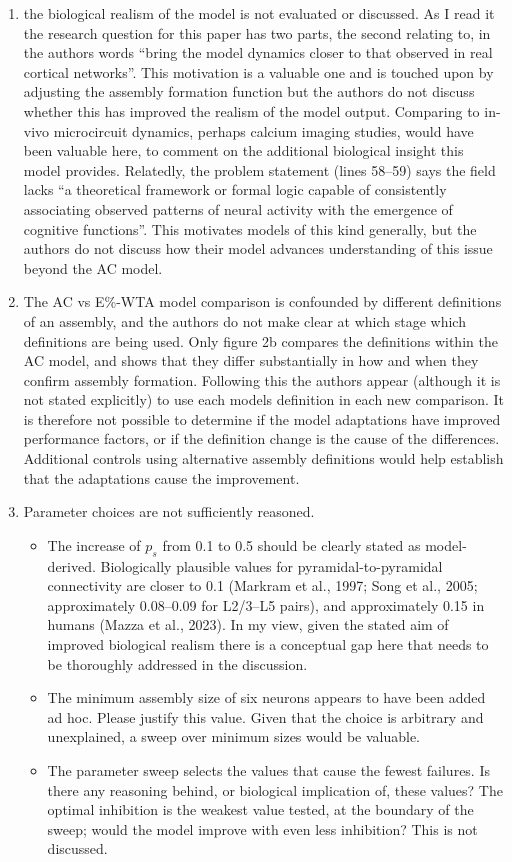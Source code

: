 \documentclass[a4paper, 11pt]{article}
\begin{document}
\begin{enumerate}
    \item the biological realism of the model is not evaluated or discussed. As I read it the research question for this paper has two parts, the second relating to, in the authors words ``bring the model dynamics closer to that observed in real cortical networks''. This motivation is a valuable one and is touched upon by adjusting the assembly formation function but the authors do not discuss whether this has improved the realism of the model output. Comparing to in-vivo microcircuit dynamics, perhaps calcium imaging studies, would have been valuable here, to comment on the additional biological insight this model provides. Relatedly, the problem statement (lines 58--59) says the field lacks ``a theoretical framework or formal logic capable of consistently associating observed patterns of neural activity with the emergence of cognitive functions''. This motivates models of this kind generally, but the authors do not discuss how their model advances understanding of this issue beyond the AC model.
    
    \item The AC vs E\%-WTA model comparison is confounded by different definitions of an assembly, and the authors do not make clear at which stage which definitions are being used. Only figure 2b compares the definitions within the AC model, and shows that they differ substantially in how and when they confirm assembly formation. Following this the authors appear (although it is not stated explicitly) to use each models definition in each new comparison. It is therefore not possible to determine if the model adaptations have improved performance factors, or if the definition change is the cause of the differences. Additional controls using alternative assembly definitions would help establish that the adaptations cause the improvement.
    
    \item Parameter choices are not sufficiently reasoned.
    \begin{itemize}
        \item The increase of $p_s$ from 0.1 to 0.5 should be clearly stated as model-derived. Biologically plausible values for pyramidal-to-pyramidal connectivity are closer to 0.1 (Markram et al., 1997; Song et al., 2005; approximately 0.08--0.09 for L2/3--L5 pairs), and approximately 0.15 in humans (Mazza et al., 2023). In my view, given the stated aim of improved biological realism there is a conceptual gap here that needs to be thoroughly addressed in the discussion.
        \item The minimum assembly size of six neurons appears to have been added ad hoc. Please justify this value. Given that the choice is arbitrary and unexplained, a sweep over minimum sizes would be valuable.
        \item The parameter sweep selects the values that cause the fewest failures. Is there any reasoning behind, or biological implication of, these values? The optimal inhibition is the weakest value tested, at the boundary of the sweep; would the model improve with even less inhibition? This is not discussed.
    \end{itemize}
    

\end{enumerate}
\end{document}
